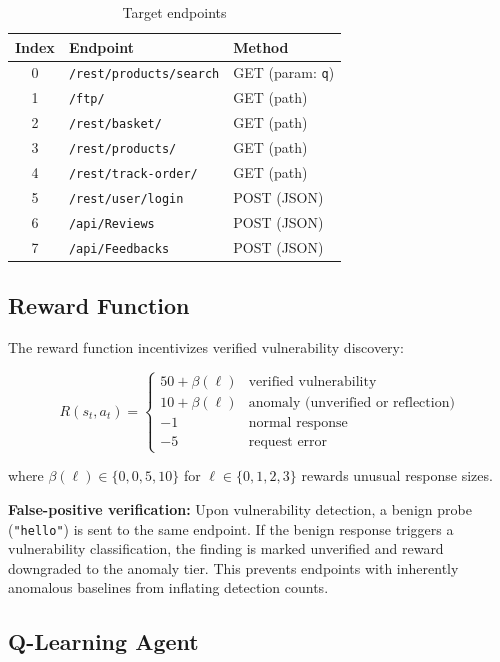 \documentclass[5p,twocolumn]{elsarticle}
\begin{document}
\begin{table}[t]
\caption{Target endpoints}
\centering
\label{tab:endpoints}
\begin{tabular}{cll}
\toprule
Index & Endpoint & Method \\
\midrule
0 & \texttt{/rest/products/search} & GET (param: \texttt{q}) \\
1 & \texttt{/ftp/} & GET (path) \\
2 & \texttt{/rest/basket/} & GET (path) \\
3 & \texttt{/rest/products/} & GET (path) \\
4 & \texttt{/rest/track-order/} & GET (path) \\
5 & \texttt{/rest/user/login} & POST (JSON) \\
6 & \texttt{/api/Reviews} & POST (JSON) \\
7 & \texttt{/api/Feedbacks} & POST (JSON) \\
\bottomrule
\end{tabular}
\end{table}

\subsection{Reward Function}

The reward function incentivizes verified vulnerability discovery:

\begin{equation}
R(s_t, a_t) =
\begin{cases}
50 + \beta(\ell) & \text{verified vulnerability} \\
10 + \beta(\ell) & \text{anomaly (unverified or reflection)} \\
-1 & \text{normal response} \\
-5 & \text{request error}
\end{cases}
\end{equation}

\noindent where $\beta(\ell) \in \{0,0,5,10\}$ for $\ell \in \{0,1,2,3\}$ rewards unusual response sizes.

\noindent\textbf{False-positive verification:} Upon vulnerability detection, a benign probe (\texttt{"hello"}) is sent to the same endpoint. If the benign response triggers a vulnerability classification, the finding is marked unverified and reward downgraded to the anomaly tier. This prevents endpoints with inherently anomalous baselines from inflating detection counts.

\subsection{Q-Learning Agent}
\end{document}
